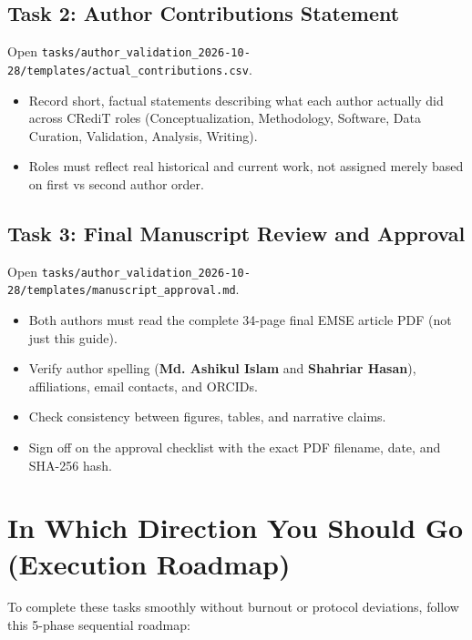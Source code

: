 \documentclass[11pt,a4paper]{article}
\begin{document}
\subsection{Task 2: Author Contributions Statement}
Open \nolinkurl{tasks/author_validation_2026-10-28/templates/actual_contributions.csv}.
\begin{itemize}
  \item Record short, factual statements describing what each author actually did across CRediT roles (Conceptualization, Methodology, Software, Data Curation, Validation, Analysis, Writing).
  \item Roles must reflect real historical and current work, not assigned merely based on first vs second author order.
\end{itemize}

\subsection{Task 3: Final Manuscript Review and Approval}
Open \nolinkurl{tasks/author_validation_2026-10-28/templates/manuscript_approval.md}.
\begin{itemize}
  \item Both authors must read the complete 34-page final EMSE article PDF (not just this guide).
  \item Verify author spelling (\textbf{Md. Ashikul Islam} and \textbf{Shahriar Hasan}), affiliations, email contacts, and ORCIDs.
  \item Check consistency between figures, tables, and narrative claims.
  \item Sign off on the approval checklist with the exact PDF filename, date, and SHA-256 hash.
\end{itemize}

\clearpage
\section{In Which Direction You Should Go (Execution Roadmap)}

To complete these tasks smoothly without burnout or protocol deviations, follow this 5-phase sequential roadmap:
\end{document}
